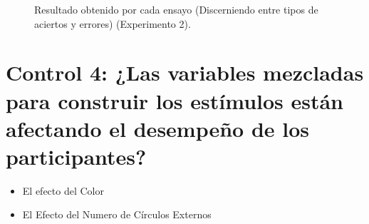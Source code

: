 \begin{figure}[th]
\caption[Outcome_Exp2]{Resultado obtenido por cada ensayo (Discerniendo entre tipos de aciertos y errores) (Experimento 2).}
\label{fig:Outcome_E2}
\end{figure}












\section{Control 4: ¿Las variables mezcladas para construir los estímulos están afectando el desempeño de los participantes?}

\begin{itemize}
\item El efecto del Color
\item El Efecto del Numero de Círculos Externos
\end{itemize}

